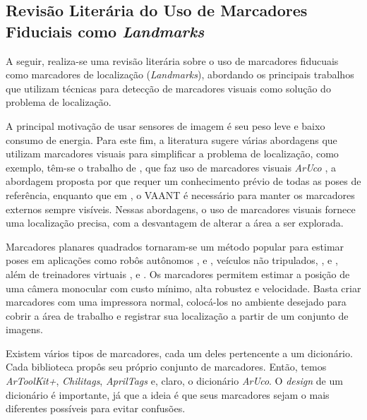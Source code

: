 
    \subsection{Revisão Literária do Uso de Marcadores Fiduciais como \textit{Landmarks}}
    
    A seguir, realiza-se uma revisão literária sobre o uso de marcadores fiducuais como marcadores de localização (\textit{Landmarks}),  abordando os principais trabalhos que utilizam técnicas para detecção de marcadores visuais como solução do problema de localização.
    
    A principal motivação de usar sensores de imagem é seu peso leve e baixo consumo de energia. Para este fim, a literatura sugere várias abordagens que utilizam marcadores visuais para simplificar a problema de localização, como exemplo, têm-se o trabalho de \citet{Pestana2016}, que faz uso de marcadores visuais \textit{ArUco} \citet{Salinas2013}, a abordagem proposta por \citet{Jayatilleke2013} que requer um conhecimento prévio de todas as poses de referência, enquanto que em \citet{Faigl2013}, o VAANT é necessário para manter os marcadores externos sempre visíveis. Nessas abordagens, o uso de marcadores visuais fornece uma localização precisa, com a desvantagem de alterar a área a ser explorada.
    
    Marcadores planares quadrados tornaram-se um método popular para estimar poses em aplicações como robôs autônomos \citet{Robert2009}, \citet{Pichler2017} e \citet{Valencia2005}, veículos não tripulados, \citet{Broggi2000}, \citet{Patterson2014} e \citet{Gonzalez2017}, além de treinadores virtuais \citet{Pflugi2017}, \citet{Chen2016} e \citet{Khattak2014}. Os marcadores permitem estimar a posição de uma câmera monocular com custo mínimo, alta robustez e velocidade. Basta criar marcadores com uma impressora normal, colocá-los no ambiente desejado para cobrir a área de trabalho e registrar sua localização a partir de um conjunto de imagens.
    
    Existem vários tipos de marcadores, cada um deles pertencente a um dicionário. Cada biblioteca propôs seu próprio conjunto de marcadores. Então, temos \textit{ArToolKit+}, \textit{Chilitags}, \textit{AprilTags} e, claro, o dicionário \textit{ArUco}. O \textit{design} de um dicionário é importante, já que a ideia é que seus marcadores sejam o mais diferentes possíveis para evitar confusões. 

